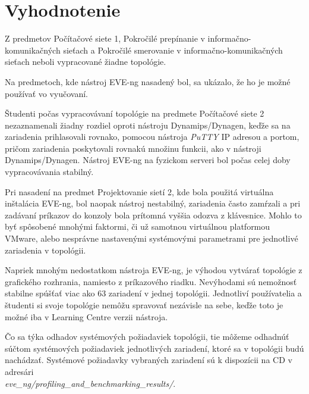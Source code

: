 \section{Vyhodnotenie}

Z predmetov Počítačové siete 1, Pokročilé prepínanie v informačno-komunikačných sieťach a Pokročilé smerovanie v informačno-komunikačných sieťach neboli vypracované žiadne topológie.

Na predmetoch, kde nástroj EVE-ng nasadený bol, sa ukázalo, že ho je možné používať vo vyučovaní.

Študenti počas vypracovávaní topológie na predmete Počítačové siete 2 nezaznamenali žiadny rozdiel oproti nástroju Dynamips/Dynagen, keďže sa na zariadenia prihlasovali rovnako, pomocou nástroja \emph{PuTTY} IP adresou a portom, pričom zariadenia poskytovali rovnakú množinu funkcii, ako v nástroji Dynamips/Dynagen. Nástroj EVE-ng na fyzickom serveri bol počas celej doby vypracovávania stabilný.

Pri nasadení na predmet Projektovanie sietí 2, kde bola použitá virtuálna inštalácia EVE-ng, bol naopak nástroj nestabilný, zariadenia často zamŕzali a pri zadávaní príkazov do konzoly bola prítomná vyššia odozva z klávesnice. Mohlo to byť spôsobené mnohými faktormi, či už samotnou virtuálnou platformou VMware, alebo nesprávne nastavenými systémovými parametrami pre jednotlivé zariadenia v topológii.

Napriek mnohým nedostatkom nástroja EVE-ng, je výhodou vytvárať topológie z grafického rozhrania, namiesto z príkazového riadku. Nevýhodami sú nemožnosť stabilne spúšťať viac ako 63 zariadení v jednej topológii. Jednotliví používatelia a študenti si svoje topológie nemôžu spravovať nezávisle na sebe, keďže toto je možné iba v Learning Centre verzii nástroja.

Čo sa týka odhadov systémových požiadaviek topológii, tie môžeme odhadnúť súčtom systémových požiadaviek jednotlivých zariadení, ktoré sa v topológii budú nachádzať. Systémové požiadavky vybraných zariadení sú k dispozícii na CD v adresári \\ \emph{eve\_ng/profiling\_and\_benchmarking\_results/}.